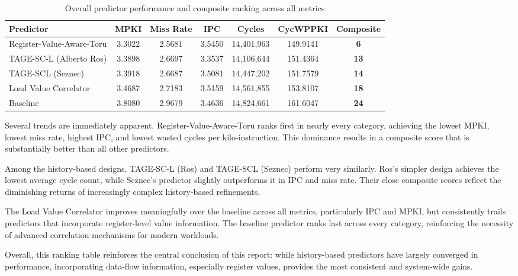 \documentclass[11pt,a4paper]{article}
\begin{document}
\begin{table}[h!]
\centering
\begin{tabular}{|l|c|c|c|c|c|c|}
\hline
\textbf{Predictor} & \textbf{MPKI} & \textbf{Miss Rate} & \textbf{IPC} & \textbf{Cycles} & \textbf{CycWPPKI} & \textbf{Composite} \\
\hline
Register-Value-Aware-Toru 
& 3.3022 & 2.5681 & 3.5450 & 14,401,963 & 149.9141 & \textbf{6} \\

TAGE-SC-L (Alberto Ros) 
& 3.3898 & 2.6697 & 3.3537 & 14,106,644 & 151.4364 & \textbf{13} \\

TAGE-SCL (Seznec) 
& 3.3918 & 2.6687 & 3.5081 & 14,447,202 & 151.7579 & \textbf{14} \\

Load Value Correlator 
& 3.4687 & 2.7183 & 3.5159 & 14,561,855 & 153.8107 & \textbf{18} \\

Baseline 
& 3.8080 & 2.9679 & 3.4636 & 14,824,661 & 161.6047 & \textbf{24} \\
\hline
\end{tabular}
\caption{Overall predictor performance and composite ranking across all metrics}
\label{tab:overall_metrics}
\end{table}

Several trends are immediately apparent. Register-Value-Aware-Toru ranks first in nearly every category, achieving the lowest MPKI, lowest miss rate, highest IPC, and lowest wasted cycles per kilo-instruction. This dominance results in a composite score that is substantially better than all other predictors.

Among the history-based designs, TAGE-SC-L (Ros) and TAGE-SCL (Seznec) perform very similarly. Ros’s simpler design achieves the lowest average cycle count, while Seznec’s predictor slightly outperforms it in IPC and miss rate. Their close composite scores reflect the diminishing returns of increasingly complex history-based refinements.

The Load Value Correlator improves meaningfully over the baseline across all metrics, particularly IPC and MPKI, but consistently trails predictors that incorporate register-level value information. The baseline predictor ranks last across every category, reinforcing the necessity of advanced correlation mechanisms for modern workloads.

Overall, this ranking table reinforces the central conclusion of this report: while history-based predictors have largely converged in performance, incorporating data-flow information, especially register values, provides the most consistent and system-wide gains.
\end{document}
